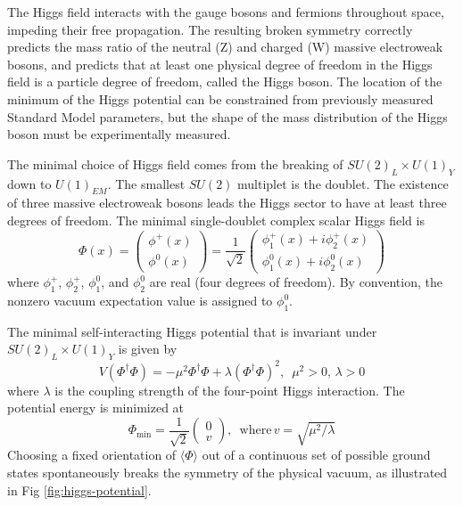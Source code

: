 \documentclass{article}
\begin{document}
The Higgs field interacts with the gauge bosons and fermions throughout space, impeding their free propagation. The resulting broken symmetry correctly predicts the mass ratio of the neutral (Z) and charged (W) massive electroweak bosons, and predicts that at least one physical degree of freedom in the Higgs field is a particle degree of freedom, called the Higgs boson. The location of the minimum of the Higgs potential can be constrained from previously measured Standard Model parameters, but the shape of the mass distribution of the Higgs boson must be experimentally measured.

The minimal choice of Higgs field comes from the breaking of $SU(2)_L \times U(1)_Y$ down to $U(1)_{EM}$. The smallest $SU(2)$ multiplet is the doublet. The existence of three massive electroweak bosons leads the Higgs sector to have at least three degrees of freedom. The minimal single-doublet complex scalar Higgs field is
\begin{equation}
    \Phi(x) = \begin{pmatrix} \phi^+(x) \\ \phi^0(x) \end{pmatrix} 
    = \frac{1}{\sqrt{2}} \begin{pmatrix} \phi_1^+(x) + i\phi_2^+(x) \\ \phi_1^0(x) + i\phi_2^0 (x) \end{pmatrix}
\end{equation}
where $\phi_1^+$, $\phi_2^+$, $\phi_1^0$, and $\phi_2^0$ are real (four degrees of freedom). By convention, the nonzero vacuum expectation value is assigned to $\phi_1^0$.

The minimal self-interacting Higgs potential that is invariant under $SU(2)_L \times U(1)_Y$ is given by
\begin{equation}
    V(\Phi^\dagger \Phi) = -\mu^2 \Phi^\dagger \Phi + \lambda (\Phi^\dagger \Phi)^2, \,\,\, \mu^2 > 0, \, \lambda > 0
\end{equation}
where $\lambda$ is the coupling strength of the four-point Higgs interaction. 
The potential energy is minimized at 
\begin{equation}
    \Phi_{\text{min}} = \frac{1}{\sqrt{2}} \begin{pmatrix} 0 \\ v \end{pmatrix}, \,\,\,\text{where} \, v = \sqrt{\mu^2 / \lambda}
\end{equation}
Choosing a fixed orientation of $\langle \Phi \rangle$ out of a continuous set of possible ground states spontaneously breaks the symmetry of the physical vacuum, as illustrated in Fig \ref{fig:higgs-potential}.
\end{document}
